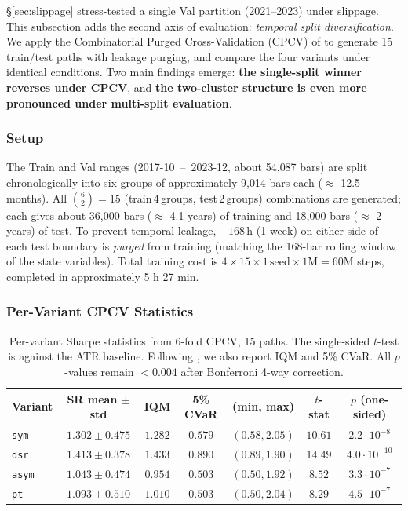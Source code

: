 \documentclass[11pt, a4paper]{article}
\begin{document}
\S\ref{sec:slippage} stress-tested a single Val partition (2021--2023) under
slippage. This subsection adds the second axis of evaluation: \emph{temporal
split diversification}. We apply the Combinatorial Purged Cross-Validation
(CPCV) of \citet{lopezdeprado2018advances} to generate 15 train/test paths
with leakage purging, and compare the four variants under identical
conditions. Two main findings emerge: \textbf{the single-split winner
reverses under CPCV}, and \textbf{the two-cluster structure is even more
pronounced under multi-split evaluation}.

\subsubsection{Setup}
\label{sec:cpcv_setup}

The Train and Val ranges (2017-10 \,--\, 2023-12, about 54{,}087 bars) are
split chronologically into six groups of approximately 9{,}014 bars each
($\approx$ 12.5 months). All $\binom{6}{2} = 15$ (train\,4\,groups,
test\,2\,groups) combinations are generated; each gives about 36{,}000 bars
($\approx$ 4.1 years) of training and 18{,}000 bars ($\approx$ 2 years) of
test. To prevent temporal leakage, $\pm 168\,\mathrm{h}$ (1 week) on either
side of each test boundary is \emph{purged} from training (matching the
168-bar rolling window of the state variables). Total training cost is
$4 \times 15 \times 1\,\text{seed} \times 1\mathrm{M} = 60$M steps,
completed in approximately 5 h 27 min.

\subsubsection{Per-Variant CPCV Statistics}
\label{sec:cpcv_per_variant}

\begin{table}[!htbp]
\centering
\small
\caption{Per-variant Sharpe statistics from 6-fold CPCV, 15 paths. The
single-sided $t$-test is against the ATR baseline. Following
\citet{henderson2018rlreproducibility}, we also report IQM and 5\% CVaR. All
$p$-values remain $< 0.004$ after Bonferroni 4-way correction.}
\begin{tabular}{lcccccc}
\toprule
Variant & SR mean $\pm$ std & IQM & 5\% CVaR & (min, max) & $t$-stat & $p$ (one-sided) \\
\midrule
\texttt{sym}  & $1.302 \pm 0.475$ & $1.282$ & $0.579$ & $(0.58, 2.05)$ & $10.61$ & $2.2 \cdot 10^{-8}$ \\
\texttt{dsr}  & $\mathbf{1.413 \pm 0.378}$ & $\mathbf{1.433}$ & $\mathbf{0.890}$ & $(0.89, 1.90)$ & $\mathbf{14.49}$ & $4.0 \cdot 10^{-10}$ \\
\texttt{asym} & $1.043 \pm 0.474$ & $0.954$ & $0.503$ & $(0.50, 1.92)$ & $8.52$ & $3.3 \cdot 10^{-7}$ \\
\texttt{pt}   & $1.093 \pm 0.510$ & $1.010$ & $0.503$ & $(0.50, 2.04)$ & $8.29$ & $4.5 \cdot 10^{-7}$ \\
\bottomrule
\end{tabular}
\label{tab:cpcv_per_variant}
\end{table}
\end{document}
